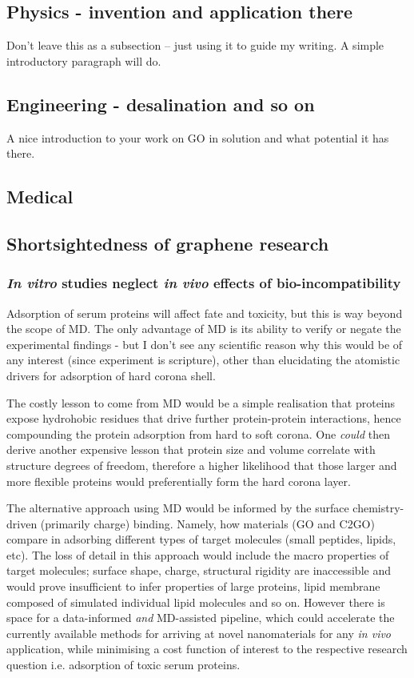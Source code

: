 \subsection{Physics - invention and application there}
Don't leave this as a subsection -- just using it to guide my writing. A simple introductory paragraph will do.

\subsection{Engineering - desalination and so on}
A nice introduction to your work on GO in solution and what potential it has there.

\subsection{Medical}


\subsection{Shortsightedness of graphene research}

\subsubsection{\emph{In vitro} studies neglect \emph{in vivo} effects of bio-incompatibility}
Adsorption of serum proteins will affect fate and toxicity, but this is way beyond the scope of MD. The only advantage of MD is its ability to verify or negate the experimental findings - but I don't see any scientific reason why this would be of any interest (since experiment is scripture), other than elucidating the atomistic drivers for adsorption of hard corona shell. 

The costly lesson to come from MD would be a simple realisation that proteins expose hydrohobic residues that drive further protein-protein interactions, hence compounding the protein adsorption from hard to soft corona. One \emph{could} then derive another expensive lesson that protein size and volume correlate with structure degrees of freedom, therefore a higher likelihood that those larger and more flexible proteins would preferentially form the hard corona layer. 

The alternative approach using MD would be informed by the surface chemistry-driven (primarily charge) binding. Namely, how materials (GO and C2GO) compare in adsorbing different types of target molecules (small peptides, lipids, etc). The loss of detail in this approach would include the macro properties of target molecules; surface shape, charge, structural rigidity are inaccessible and would prove insufficient to infer properties of large proteins, lipid membrane composed of simulated individual lipid molecules and so on. However there is space for a data-informed \emph{and} MD-assisted pipeline, which could accelerate the currently available methods for arriving at novel nanomaterials for any \emph{in vivo} application, while minimising a cost function of interest to the respective research question i.e. adsorption of toxic serum proteins.

